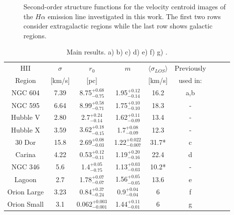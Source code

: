 \documentclass[fleqn,usenatbib, useAMS, a4paper]{mnras}
\begin{document}
\begin{figure}
\begin{multicols}{3}
\end{multicols}
\caption{Second-order structure functions for the velocity centroid images of the \(H\alpha\) emission line investigated in this work. The first two rows consider extragalactic regions while the last row shows galactic regions.}
\label{fig:SFs}
\end{figure}

\begin{table}
\begin{center}\caption{Main results.
 a) \citet{tanco1997}
      b) \citet{2019arXiv191203543M}
      c) \citet{Castro:2018a}
      d) \citet{Damiani:2016a}
      e) \citet{Damiani:2017b}
      f) \citet{1987A&A...176..347H}
      g) \citet{arthur2016turbulence}.}
\begin{tabular}{ccccccccc}\hline
HII         &\(\sigma\) &\(r_0\)                     &\(m\)    &\(\langle \sigma_{LOS} \rangle \) & Previously\\
Region      &[km/s]     &[pc]                        &                           &  [km/s]& used in:\\ \hline
NGC 604     &7.39       &8.75\(^{+0.68}_{-0.75}\)    &1.95\(^{+0.12}_{-0.14}\)   &16.2  &a,b \\
NGC 595     &6.64       &8.99\(^{+0.58}_{-0.71}\)    &1.75\(^{+0.10}_{-0.10}\)   &18.3  &- \\
Hubble V    &2.80       &2.7\(^{+0.24}_{-0.14}\)     &1.62\(^{+0.11}_{-0.09}\)   &13.4  &- \\ 
Hubble X    &3.59       &3.62\(^{+0.18}_{-0.15}\)    &1.7\(^{+0.08}_{-0.09}\)    &12.3  &- \\   
30 Dor      &15.8       &2.69\(^{+0.08}_{-0.03}\)    &1.22\(^{+0.022}_{-0.007}\) &31.7* &c\\
Carina      &4.22       &0.53\(^{+0.12}_{-0.11}\)    &1.19\(^{+0.20}_{ -0.16}\)  &22.4  &d\\
NGC 346     & 5.6       &1.4\(^{+0.05}_{-0.75}\)     &1.13\(^{+0.03}_{-0.03}\)   &10.2* &-\\
Lagoon      &2.7        &1.78\(^{+0.07}_{-0.07}\)    &1.56\(^{+0.05}_{-0.05}\)   &13.6  &e\\ 
Orion Large &3.23       &0.84\(^{+0.37}_{-0.24}\)    &0.9\(^{+0.04}_{-0.04}\)    &6     &f \\
Orion Small &3.1        & 0.062\(^{+0.003}_{-0.001}\)&1.44\(^{+0.11}_{-0.01}\)   &6     &g \\\hline	  
\end{tabular}\label{tab:Res}
\end{center}
\end{table}  
\end{document}
